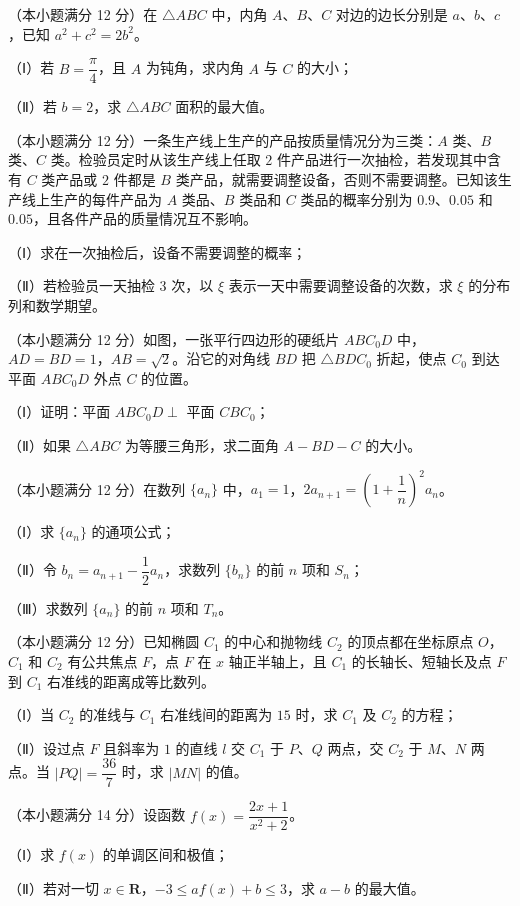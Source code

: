 \begin{question}
（本小题满分 12 分）在 $\triangle ABC$ 中，内角 $A$、$B$、$C$ 对边的边长分别是 $a$、$b$、$c$，已知 $a^2+c^2=2b^2$。

（Ⅰ）若 $B=\dfrac{\pi}4$，且 $A$ 为钝角，求内角 $A$ 与 $C$ 的大小；

（Ⅱ）若 $b=2$，求 $\triangle ABC$ 面积的最大值。

\end{question}
\begin{question}
（本小题满分 12 分）一条生产线上生产的产品按质量情况分为三类：$A$ 类、$B$ 类、$C$ 类。检验员定时从该生产线上任取 $2$ 件产品进行一次抽检，若发现其中含有 $C$ 类产品或 $2$ 件都是 $B$ 类产品，就需要调整设备，否则不需要调整。已知该生产线上生产的每件产品为 $A$ 类品、$B$ 类品和 $C$ 类品的概率分别为 $0.9$、$0.05$ 和 $0.05$，且各件产品的质量情况互不影响。

（Ⅰ）求在一次抽检后，设备不需要调整的概率；

（Ⅱ）若检验员一天抽检 $3$ 次，以 $\xi$ 表示一天中需要调整设备的次数，求 $\xi$ 的分布列和数学期望。

\Needspace{0.4\textheight}
\end{question}
\begin{question}
（本小题满分 12 分）如图，一张平行四边形的硬纸片 $ABC_0D$ 中，$AD=BD=1$，$AB=\sqrt2$。沿它的对角线 $BD$ 把 $\triangle BDC_0$ 折起，使点 $C_0$ 到达平面 $ABC_0D$ 外点 $C$ 的位置。

（Ⅰ）证明：平面 $ABC_0D\perp$ 平面 $CBC_0$；

（Ⅱ）如果 $\triangle ABC$ 为等腰三角形，求二面角 $A-BD-C$ 的大小。
\nopagebreak[4]
\begin{center}\end{center}
\nopagebreak[4]
\end{question}
\begin{question}
（本小题满分 12 分）在数列 $\{a_n\}$ 中，$a_1=1$，$2a_{n+1}=\left(1+\dfrac1n\right)^2a_n$。

（Ⅰ）求 $\{a_n\}$ 的通项公式；

（Ⅱ）令 $b_n=a_{n+1}-\dfrac12a_n$，求数列 $\{b_n\}$ 的前 $n$ 项和 $S_n$；

（Ⅲ）求数列 $\{a_n\}$ 的前 $n$ 项和 $T_n$。

\end{question}
\begin{question}
（本小题满分 12 分）已知椭圆 $C_1$ 的中心和抛物线 $C_2$ 的顶点都在坐标原点 $O$，$C_1$ 和 $C_2$ 有公共焦点 $F$，点 $F$ 在 $x$ 轴正半轴上，且 $C_1$ 的长轴长、短轴长及点 $F$ 到 $C_1$ 右准线的距离成等比数列。

（Ⅰ）当 $C_2$ 的准线与 $C_1$ 右准线间的距离为 $15$ 时，求 $C_1$ 及 $C_2$ 的方程；

（Ⅱ）设过点 $F$ 且斜率为 $1$ 的直线 $l$ 交 $C_1$ 于 $P$、$Q$ 两点，交 $C_2$ 于 $M$、$N$ 两点。当 $|PQ|=\dfrac{36}7$ 时，求 $|MN|$ 的值。

\end{question}
\begin{question}
（本小题满分 14 分）设函数 $f(x)=\dfrac{2x+1}{x^2+2}$。

（Ⅰ）求 $f(x)$ 的单调区间和极值；

（Ⅱ）若对一切 $x\in\mathbf R$，$-3\leqslant af(x)+b\leqslant3$，求 $a-b$ 的最大值。

\end{question}